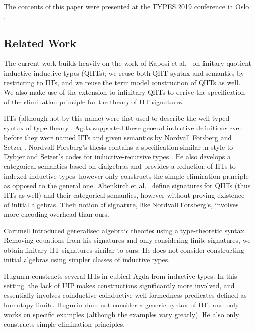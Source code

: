 \documentclass[a4paper,UKenglish,cleveref, autoref]{lipics-v2019}
\begin{document}
The contents of this paper were presented at the TYPES 2019 conference
in Oslo \cite{types}.

\subsection{Related Work}
\label{sec:related}

The current work builds heavily on the work of Kaposi et al.\
\cite{Kaposi:2019:CQI:3302515.3290315} on finitary quotient
inductive-inductive types (QIITs); we reuse both QIIT syntax and
semantics by restricting to IITs, and we reuse the term model
construction of QIITs as well. We also make use of the extension to
infinitary QIITs \cite{large_inf_qiit} to derive the specification of
the elimination principle for the theory of IIT signatures.

IITs (although not by this name) were first used to describe the
well-typed syntax of type theory \cite{nisse,chapman09eatitself}. Agda
supported these general inductive definitions even before they were
named IITs and given semantics by Nordvall Forsberg and Setzer
\cite{nordvallforsbergSetzer2010inductiveinductive}. Nordvall
Forsberg's thesis \cite{forsberg-phd} contains a specification similar
in style to Dybjer and Setzer's codes for inductive-recursive types
\cite{Dybjer99afinite}. He also develops a categorical semantics based
on dialgebras and provides a reduction of IITs to indexed inductive
types, however only constructs the simple elimination principle as
opposed to the general one. Altenkirch et al.\ \cite{gabe} define
signatures for QIITs (thus IITs as well) and their categorical
semantics, however without proving existence of initial
algebras. Their notion of signature, like Nordvall Forsberg's,
involves more encoding overhead than ours.

Cartmell \cite{gat} introduced generalised algebraic theories using a
type-theoretic syntax. Removing equations from his signatures and only
considering finite signatures, we obtain finitary IIT signatures similar to
ours. He does not consider constructing initial algebras using simpler classes
of inductive types.

Hugunin \cite{jasper} constructs several IITs in cubical Agda from
inductive types. In this setting, the lack of UIP makes constructions
significantly more involved, and essentially involves
coinductive-coinductive well-formedness predicates defined as homotopy
limits. Hugunin does not consider a generic syntax of IITs and only
works on specific examples (although the examples vary greatly). He
also only constructs simple elimination principles.
\end{document}
